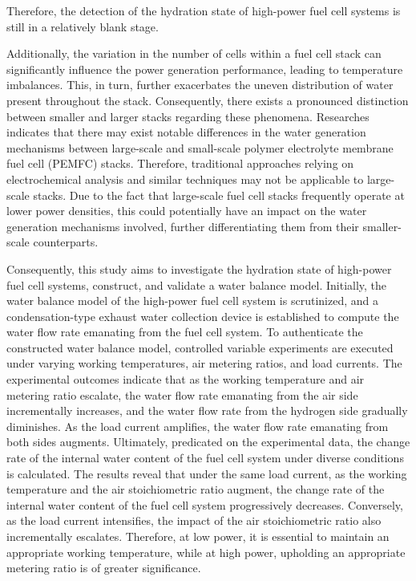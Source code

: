 Therefore, the detection of the hydration state of high-power fuel cell systems is still in a relatively blank stage.


\par
Additionally, the variation in the number of cells within a fuel cell stack can significantly influence the power generation performance, leading to temperature imbalances\cite{millerReviewPolymerElectrolyte2011}. This, in turn, further exacerbates the uneven distribution of water present throughout the stack. Consequently, there exists a pronounced distinction between smaller and larger stacks regarding these phenomena.
Researches indicates that there may exist notable differences in the water generation mechanisms between large-scale and small-scale polymer electrolyte membrane fuel cell (PEMFC) stacks\cite{jiReviewWaterManagement2009}. Therefore, traditional approaches relying on electrochemical analysis and similar techniques may not be applicable to large-scale stacks. Due to the fact that large-scale fuel cell stacks frequently operate at lower power densities\cite{shojayianSimulationCathodeCatalyst2024}, this could potentially have an impact on the water generation mechanisms involved, further differentiating them from their smaller-scale counterparts.

\par
Consequently, this study aims to investigate the hydration state of high-power fuel cell systems, construct, and validate a water balance model. Initially, the water balance model of the high-power fuel cell system is scrutinized, and a condensation-type exhaust water collection device is established to compute the water flow rate emanating from the fuel cell system.
To authenticate the constructed water balance model, controlled variable experiments are executed under varying working temperatures, air metering ratios, and load currents. The experimental outcomes indicate that as the working temperature and air metering ratio escalate, the water flow rate emanating from the air side incrementally increases, and the water flow rate from the hydrogen side gradually diminishes.
As the load current amplifies, the water flow rate emanating from both sides augments. Ultimately, predicated on the experimental data, the change rate of the internal water content of the fuel cell system under diverse conditions is calculated. The results reveal that under the same load current, as the working temperature and the air stoichiometric ratio augment, the change rate of the internal water content of the fuel cell system progressively decreases.
Conversely, as the load current intensifies, the impact of the air stoichiometric ratio also incrementally escalates. Therefore, at low power, it is essential to maintain an appropriate working temperature, while at high power, upholding an appropriate metering ratio is of greater significance.

